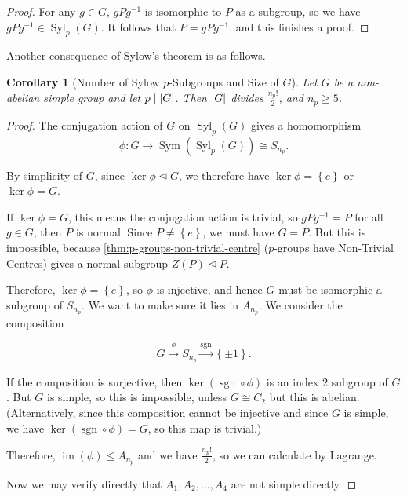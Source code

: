 \documentclass{article}
\newtheorem{corollary}[theorem]{Corollary}
\theoremstyle{definition}
\theoremstyle{remark}
\DeclarePairedDelimiter{\abs}{\lvert}{\rvert}
\newcommand{\pqty}[1]{\left(#1\right)}
\newcommand{\Bqty}[1]{\left\{#1\right\}}
\newcommand{\functiondomain}[3]{#1:#2\to #3}
\newcommand{\inverse}{^{-1}}
\newcommand{\isomorphic}{\cong}
\newcommand{\normalsub}{\trianglelefteq}
\newcommand{\subgroup}{\leq}
\newcommand{\divides}{\mid}
\newcommand{\Syl}{\operatorname{Syl}}
\newcommand{\Sym}{\operatorname{Sym}}
\newcommand{\img}{\operatorname{im}}
\newcommand{\sign}{\operatorname{sgn}}
\begin{document}
\begin{proof}
    For any \(g \in G\), \(g P g\inverse\) is isomorphic to \(P\) as a subgroup, so we have \(g P g\inverse \in \Syl_p\pqty{G}\). It follows that \(P = g P g\inverse\), and this finishes a proof.
\end{proof}

Another consequence of Sylow's theorem is as follows.

\begin{corollary}[Number of Sylow \(p\)-Subgroups and Size of \(G\)]
    \label{cor:np-and-g}%
    Let \(G\) be a non-abelian simple group and let \(p \divides \abs{G}\). Then \(\abs{G}\) divides \(\frac{n_p!}{2}\), and \(n_p \geq 5\).
\end{corollary}

\begin{proof}
    The conjugation action of \(G\) on \(\Syl_p\pqty{G}\) gives a homomorphism
    \[
        \functiondomain{\phi}{G}{\Sym\pqty{\Syl_p\pqty{G}} \isomorphic S_{n_p}}.
    \]

    By simplicity of \(G\), since \(\ker \phi \normalsub G\), we therefore have \(\ker \phi = \Bqty{e}\) or \(\ker \phi = G\).

    If \(\ker \phi = G\), this means the conjugation action is trivial, so \(g P g\inverse = P\) for all \(g \in G\), then \(P\) is normal. Since \(P \neq \Bqty{e}\), we must have \(G = P\). But this is impossible, because \autoref{thm:p-groups-non-trivial-centre} (\(p\)-groups have Non-Trivial Centres) gives a normal subgroup \(Z\pqty{P} \normalsub P\).

    Therefore, \(\ker \phi = \Bqty{e}\), so \(\phi\) is injective, and hence \(G\) must be isomorphic a subgroup of \(S_{n_p}\). We want to make sure it lies in \(A_{n_p}\). We consider the composition

    \[
        G \overset{\phi}{\longrightarrow} S_{n_p} \overset{\sign}{\longrightarrow} \Bqty{\pm 1}.
    \]

    If the composition is surjective, then \(\ker \pqty{\sign \circ \phi}\) is an index \(2\) subgroup of \(G\). But \(G\) is simple, so this is impossible, unless \(G \isomorphic C_2\) but this is abelian. (Alternatively, since this composition cannot be injective and since \(G\) is simple, we have \(\ker \pqty{\sign \circ \phi} = G\), so this map is trivial.)

    Therefore, \(\img \pqty{\phi} \subgroup A_{n_p}\) and we have \(\frac{n_ p!}{2}\), so we can calculate by Lagrange.

    Now we may verify directly that \(A_1, A_2, \ldots, A_4\) are not simple directly.
\end{proof}
\end{document}
